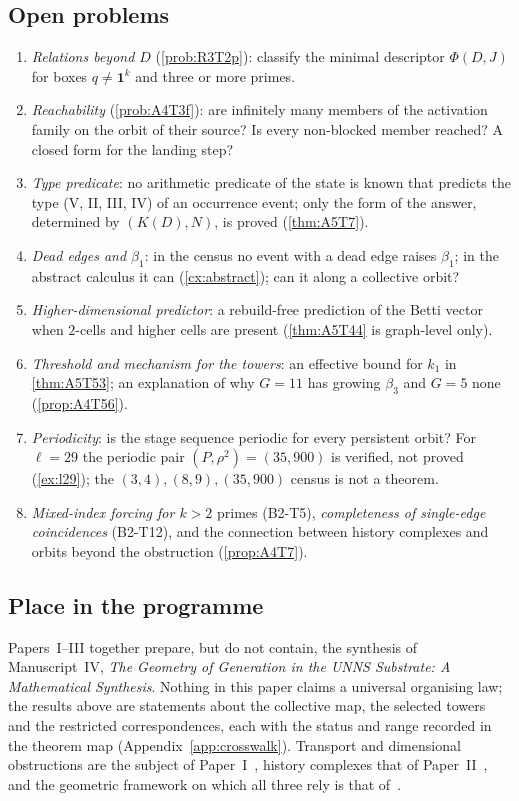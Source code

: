 \subsection{Open problems}
\begin{enumerate}[label=\textbf{P\arabic*.},itemsep=2pt]
\item \emph{Relations beyond $D$} (\cref{prob:R3T2p}): classify the minimal descriptor $\Phi(D,J)$ for boxes $q\ne\mathbf 1^k$ and three or more primes.
\item \emph{Reachability} (\cref{prob:A4T3f}): are infinitely many members of the activation family on the orbit of their source? Is every non-blocked member reached? A closed form for the landing step?
\item \emph{Type predicate}: no arithmetic predicate of the state is known that predicts the type (V, II, III, IV) of an occurrence event; only the form of the answer, determined by $(K(D),N)$, is proved (\cref{thm:A5T7}).
\item \emph{Dead edges and $\beta_1$}: in the census no event with a dead edge raises $\beta_1$; in the abstract calculus it can (\cref{cx:abstract}); can it along a collective orbit?
\item \emph{Higher-dimensional predictor}: a rebuild-free prediction of the Betti vector when $2$-cells and higher cells are present (\cref{thm:A5T44} is graph-level only).
\item \emph{Threshold and mechanism for the towers}: an effective bound for $k_1$ in \cref{thm:A5T53}; an explanation of why $G=11$ has growing $\beta_3$ and $G=5$ none (\cref{prop:A4T56}).
\item \emph{Periodicity}: is the stage sequence periodic for every persistent orbit? For $\ell=29$ the periodic pair $(P,\rho^2)=(35,900)$ is verified, not proved (\cref{ex:l29}); the $(3,4),(8,9),(35,900)$ census is not a theorem.
\item \emph{Mixed-index forcing for $k>2$} primes (B2-T5), \emph{completeness of single-edge coincidences} (B2-T12), and the connection between history complexes and orbits beyond the obstruction (\cref{prop:A4T7}).
\end{enumerate}

\subsection{Place in the programme}
Papers~I--III together prepare, but do not contain, the synthesis of Manuscript~IV, \emph{The Geometry of Generation in the UNNS Substrate: A Mathematical Synthesis}. Nothing in this paper claims a universal organising law; the results above are statements about the collective map, the selected towers and the restricted correspondences, each with the status and range recorded in the theorem map (Appendix~\ref{app:crosswalk}). Transport and dimensional obstructions are the subject of Paper~I~\cite{PaperI}, history complexes that of Paper~II~\cite{PaperII}, and the geometric framework on which all three rely is that of~\cite{GEOI}.
